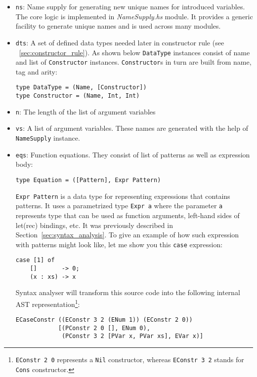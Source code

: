 \documentclass[a4paper]{report}
\begin{document}
\begin{itemize}
  \item \texttt{ns}: Name supply for generating new unique names for
    introduced variables. The core logic is implemented in
    \textit{NameSupply.hs} module. It provides a generic facility to generate
    unique names and is used across many modules.
  \item \texttt{dts}: A set of defined data types needed later in constructor
    rule (see ~\ref{sec:constructor_rule}). As shown below \texttt{DataType}
    instances consist of name and list of \texttt{Constructor} instances.
    \texttt{Constructor}s in turn are built from name, tag and arity:

\begin{lstlisting}
type DataType = (Name, [Constructor])
type Constructor = (Name, Int, Int)
\end{lstlisting}

  \item \texttt{n}: The length of the list of argument variables
  \item \texttt{vs}: A list of argument variables. These names are generated
    with the help of \texttt{NameSupply} instance.
  \item \texttt{eqs}: Function equations. They consist of list of patterns as
    well as expression body:
\begin{lstlisting}
type Equation = ([Pattern], Expr Pattern)
\end{lstlisting}
\texttt{Expr Pattern} is a data type for representing expressions that contains
patterns. It uses a parametrized type \texttt{Expr a} where the parameter
\texttt{a} represents type that can be used as function arguments, left-hand
sides of let(rec) bindings, etc. It was previously described in
Section~\ref{sec:syntax_analysis}.
To give an example of how such expression with patterns might look like, let me
show you this \texttt{case} expression:
\begin{lstlisting}
case [1] of
    []       -> 0;
    (x : xs) -> x
\end{lstlisting}
Syntax analyser will transform this source code into the following internal AST
representation\footnote{\texttt{EConstr 2 0} represents a \texttt{Nil}
constructor, whereas \texttt{EConstr 3 2} stands for \texttt{Cons} constructor.}:
\begin{lstlisting}
ECaseConstr ((EConstr 3 2 (ENum 1)) (EConstr 2 0))
            [(PConstr 2 0 [], ENum 0),
             (PConstr 3 2 [PVar x, PVar xs], EVar x)]
\end{lstlisting}


\end{itemize}
\end{document}
